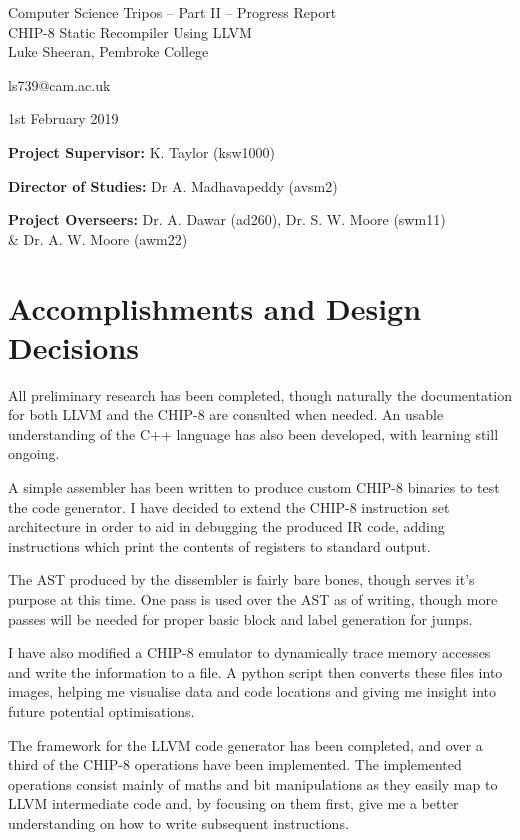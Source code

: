 \documentclass[12pt,a4paper,twoside]{article}
\begin{document}
\begin{center}
\Large
Computer Science Tripos -- Part II -- Progress Report\\[4mm]
\LARGE
CHIP-8 Static Recompiler Using LLVM\\[4mm]

\large
Luke Sheeran, Pembroke College

ls739@cam.ac.uk

1st February 2019
\end{center}

\vspace{5mm}

\textbf{Project Supervisor:} K. Taylor (ksw1000)

\textbf{Director of Studies:} Dr A. Madhavapeddy (avsm2)

\textbf{Project Overseers:} Dr. A. Dawar (ad260), Dr. S. W. Moore (swm11) \\\& Dr. A. W. Moore (awm22)



\section*{Accomplishments and Design Decisions}
All preliminary research has been completed, though naturally the documentation for both LLVM and the CHIP-8 are consulted when needed. An usable understanding of the C++ language has also been developed, with learning still ongoing.

A simple assembler has been written to produce custom CHIP-8 binaries to test the code generator. I have decided to extend the CHIP-8 instruction set architecture in order to aid in debugging the produced IR code, adding instructions which print the contents of registers to standard output.

The AST produced by the dissembler is fairly bare bones, though serves it's purpose at this time. One pass is used over the AST as of writing, though more passes will be needed for proper basic block and label generation for jumps.

I have also modified a CHIP-8 emulator to dynamically trace memory accesses and write the information to a file. A python script then converts these files into images, helping me visualise data and code locations and giving me insight into future potential optimisations.

The framework for the LLVM code generator has been completed, and over a third of the CHIP-8 operations have been implemented. The implemented operations consist mainly of maths and bit manipulations as they easily map to LLVM intermediate code and, by focusing on them first, give me a better understanding on how to write subsequent instructions.
\end{document}
